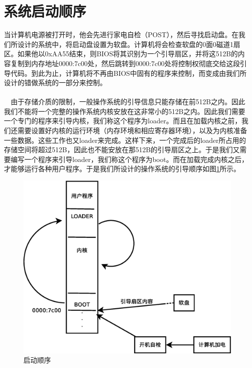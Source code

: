 \documentclass[UTF8,nofonts,cs4size]{ctexrep}
\begin{document}
\section{系统启动顺序}
当计算机电源被打开时，他会先进行家电自检（POST），然后寻找启动盘。在我们所设计的系统中，将启动盘设置为软盘。计算机将会检查软盘的0面0磁道1扇区。如果他以0xAA55结束，则BIOS将其识别为一个引导扇区，并将这512B的内容复制到内存地址0000:7c00处，然后跳转到0000:7c00处将控制权彻底交给这段引导代码。到此为止，计算机将不再由BIOS中固有的程序来控制，而变成由我们所设计的错做系统的一部分来控制。
\paragraph{}
\indent \ \ 
由于存储介质的限制，一般操作系统的引导信息只能存储在前512B之内。因此我们不能将一个完整的操作系统内核安放在这非常小的512B之内。因此我们需要一个专门的程序来引导内核，我们称这个程序为loader。而且在加载内核之前，我们还需要设置好内核的运行环境（内存环境和相应寄存器环境），以及为内核准备一些数据。这些工作也又loader来完成。这样下来，一个完成后的loader所占用的存储空间将超过512B，因此也不能安放在那512B的引导扇区之上。于是我们又需要编写一个程序来引导loader，我们称这个程序为boot。而在加载完成内核之后，才能够运行各种用户程序。于是我们所设计的操作系统的引导顺序如图\ref{start}所示。

\begin{figure}[htp]
\centering
\includegraphics[scale=0.38]{start.eps}
\caption{启动顺序}
\label{start}
\end{figure}
\end{document}
